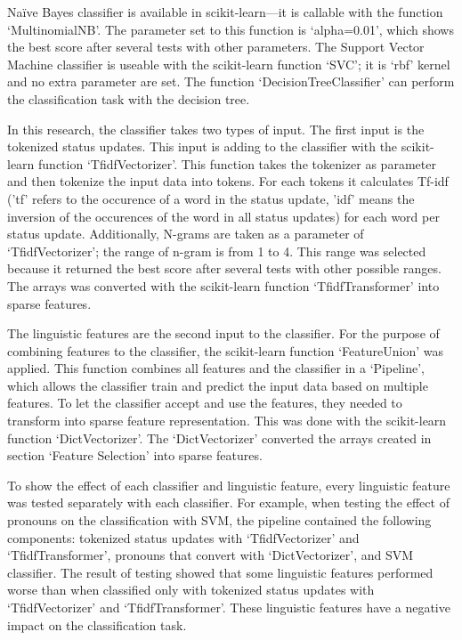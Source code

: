 \documentclass[
10pt, %
a4paper, %
oneside, %
headinclude,footinclude, %
] {book}%
\begin{document}
Naïve Bayes classifier is available in scikit-learn—it is callable with the function ‘MultinomialNB’. The parameter set to this function is ‘alpha=0.01’, which shows the best score after several tests with other parameters. The Support Vector Machine classifier is useable with the scikit-learn function ‘SVC’; it is ‘rbf’ kernel and no extra parameter are set. The function ‘DecisionTreeClassifier’ can perform the classification task with the decision tree.

In this research, the classifier takes two types of input. The first input is the tokenized status updates. This input is adding to the classifier with the scikit-learn function ‘TfidfVectorizer’. This function takes the tokenizer as parameter and then tokenize the input data into tokens. For each tokens it calculates Tf-idf ('tf' refers to the occurence of a word in the status update, 'idf' means the inversion of the occurences of the word in all status updates) for each word per status update. Additionally, N-grams are taken as a parameter of ‘TfidfVectorizer’; the range of n-gram is from 1 to 4. This range was selected because it returned the best score after several tests with other possible ranges. The arrays was converted with the scikit-learn function ‘TfidfTransformer’ into sparse features.

The linguistic features are the second input to the classifier. For the purpose of combining features to the classifier, the scikit-learn function ‘FeatureUnion’ was applied. This function combines all features and the classifier in a ‘Pipeline’, which allows the classifier train and predict the input data based on multiple features. To let the classifier accept and use the features, they needed to transform into sparse feature representation. This was done with the  scikit-learn function ‘DictVectorizer’. The ‘DictVectorizer’ converted the arrays created in section ‘Feature Selection’ into sparse features.

To show the effect of each classifier and linguistic feature, every linguistic feature was tested separately with each classifier. For example, when testing the effect of pronouns on the classification with SVM, the pipeline contained the following components: tokenized status updates with ‘TfidfVectorizer’ and ‘TfidfTransformer’, pronouns that convert with ‘DictVectorizer’, and SVM classifier. The result of testing showed that some linguistic features performed worse than when classified only with tokenized status updates with ‘TfidfVectorizer’ and ‘TfidfTransformer’. These linguistic features have a negative impact on the classification task. 
\end{document}
